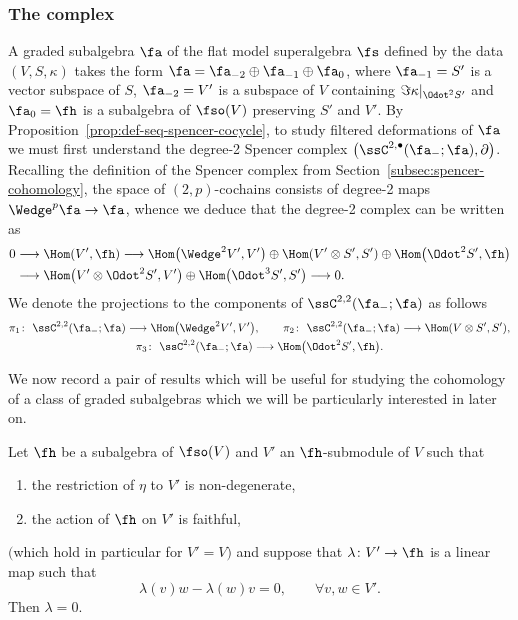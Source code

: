 \subsubsection{The complex}

A graded subalgebra $\fa$ of the flat model superalgebra $\fs$ defined by the data $(V,S,\kappa)$ takes the form $\fa=\fa_{-2}\oplus\fa_{-1}\oplus\fa_0$, where $\fa_{-1}=S'$ is a vector subspace of $S$, $\fa_{-2}=V'$ is a subspace of $V$ containing $\Im \kappa|_{\Odot^2S'}$ and $\fa_0=\fh$ is a subalgebra of $\fso(V)$ preserving $S'$ and $V'$. By Proposition~\ref{prop:def-seq-spencer-cocycle}, to study filtered deformations of $\fa$ we must first understand the degree-2 Spencer complex $\bigl(\ssC^{2,\bullet}(\fa_-;\fa),\partial\bigr)$. Recalling the definition of the Spencer complex from Section~\ref{subsec:spencer-cohomology}, the space of $(2,p)$-cochains consists of degree-2 maps $\Wedge^p\fa\to\fa$, whence we deduce that the degree-2 complex can be written as
\begin{align*}
	0 &\longrightarrow \Hom(V',\fh)
\longrightarrow \Hom\bigl(\Wedge^2V',V'\bigr)\oplus\Hom(V'\otimes S',S')\oplus\Hom\bigl(\Odot^2S',\fh\bigr)\\
	&\longrightarrow \Hom\bigl(V'\otimes\Odot^2S',V'\bigr)\oplus\Hom\bigl(\Odot^3S',S'\bigr)\longrightarrow 0.
\end{align*}
We denote the projections to the components of $\ssC^{2,2}(\fa_-;\fa)$ as follows
\begin{gather*}
	\pi_1\colon\ \ssC^{2,2}(\fa_-;\fa) \longrightarrow \Hom\bigl(\Wedge^2V',V'\bigr),\qquad
	\pi_2\colon\ \ssC^{2,2}(\fa_-;\fa) \longrightarrow \Hom(V\otimes S',S'),\\
	\pi_3\colon\ \ssC^{2,2}(\fa_-;\fa) \longrightarrow \Hom\bigl(\Odot^2S',\fh\bigr).
\end{gather*}

We now record a pair of results which will be useful for studying the cohomology of a class of graded subalgebras which we will be particularly interested in later on.

\begin{Lemma}\label{lemma:V-h-maps}
	Let $\fh$ be a subalgebra of $\fso(V)$ and $V'$ an $\fh$-submodule of $V$ such that
	\begin{enumerate}\itemsep=0pt
		\item[$(1)$] the restriction of $\eta$ to $V'$ is non-degenerate,
		\item[$(2)$] the action of $\fh$ on $V'$ is faithful,
	\end{enumerate}
	$($which hold in particular for $V'=V)$ and suppose that $\lambda\colon V'\to\fh$ is a linear map such that
	\[%
		\lambda(v)w - \lambda(w)v = 0, \qquad \forall v,w\in V'.
	\]
	Then $\lambda=0$.
\end{Lemma}

